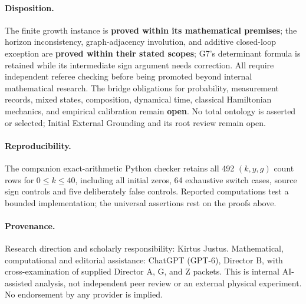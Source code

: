 \documentclass[11pt]{article}
\begin{document}
\paragraph{Disposition.} The finite growth instance is \textbf{proved within its mathematical premises}; the horizon inconsistency, graph-adjacency involution, and additive closed-loop exception are \textbf{proved within their stated scopes}; G7's determinant formula is retained while its intermediate sign argument needs correction. All require independent referee checking before being promoted beyond internal mathematical research. The bridge obligations for probability, measurement records, mixed states, composition, dynamical time, classical Hamiltonian mechanics, and empirical calibration remain \textbf{open}. No total ontology is asserted or selected; Initial External Grounding and its root review remain open.

\paragraph{Reproducibility.} The companion exact-arithmetic Python checker retains all 492 $(k,y,g)$ count rows for $0\le k\le40$, including all initial zeros, 64 exhaustive switch cases, source sign controls and five deliberately false controls. Reported computations test a bounded implementation; the universal assertions rest on the proofs above.

\paragraph{Provenance.} Research direction and scholarly responsibility: Kirtus Justus. Mathematical, computational and editorial assistance: ChatGPT (GPT-6), Director B, with cross-examination of supplied Director A, G, and Z packets. This is internal AI-assisted analysis, not independent peer review or an external physical experiment. No endorsement by any provider is implied.
\end{document}
